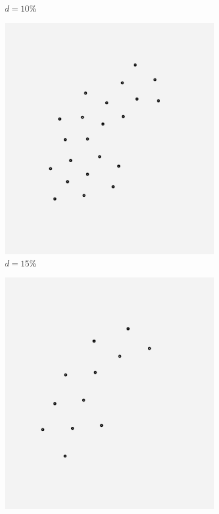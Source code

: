 \begin{figure}[!h]
\begin{subfigure}[b]{0.24\linewidth}
	\caption{\small $d=10\%$} 
    \label{fig:10_sweden} 
    \vspace{4ex}
  \end{subfigure}%
  \begin{subfigure}[b]{0.24\linewidth}
    \centering
    \includegraphics[width=0.9\linewidth]{Pictures/15_sweden} 
    \caption{\small $d=15\%$} 
    \label{fig:15_sweden} 
    \vspace{4ex}
  \end{subfigure}
  \begin{subfigure}[b]{0.24\linewidth}
  	\centering
  	\includegraphics[width=0.9\linewidth]{Pictures/20_sweden} 

\end{subfigure}
\end{figure}
